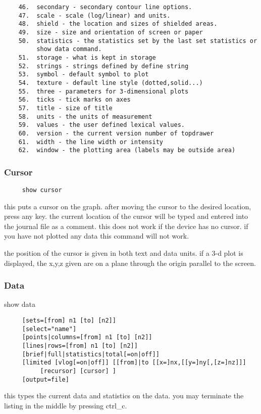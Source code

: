 \begin{verbatim}
    46.  secondary - secondary contour line options.  
    47.  scale - scale (log/linear) and units.  
    48.  shield - the location and sizes of shielded areas.  
    49.  size - size and orientation of screen or paper 
    50.  statistics - the statistics set by the last set statistics or
         show data command.  
    51.  storage - what is kept in storage 
    52.  strings - strings defined by define string 
    53.  symbol - default symbol to plot 
    54.  texture - default line style (dotted,solid...) 
    55.  three - parameters for 3-dimensional plots 
    56.  ticks - tick marks on axes 
    57.  title - size of title 
    58.  units - the units of measurement 
    59.  values - the user defined lexical values.  
    60.  version - the current version number of topdrawer 
    61.  width - the line width or intensity 
    62.  window - the plotting area (labels may be outside area) 
\end{verbatim}
\subsubsection{Cursor}
\begin{verbatim}
     show cursor 
\end{verbatim}

this  puts  a  cursor  on  the  graph.   after moving the cursor to the
desired location, press any key.  the current location  of  the  cursor
will  be  typed  and  entered into the journal file as a comment.  this
does not work if the device has no cursor.  if you have not plotted any
data this command will not work.  

the  position of the cursor is given in both text and data units.  if a
3-d plot is displayed, the x,y,z given  are  on  a  plane  through  the
origin parallel to the screen.  
\subsubsection{Data}
show data 
\begin{verbatim}
     [sets=[from] n1 [to] [n2]] 
     [select="name"] 
     [points|columns=[from] n1 [to] [n2]] 
     [lines|rows=[from] n1 [to] [n2]] 
     [brief|full|statistics|total[=on|off]] 
     [limited [vlog[=on|off]] [[from]|to [[x=]nx,[[y=]ny[,[z=]nz]]]
          [recursor] [cursor] ] 
     [output=file] 
\end{verbatim}
this  types  the  current  data  and  statistics  on the data.  you may
terminate the listing in the middle by pressing ctrl\_c.  
